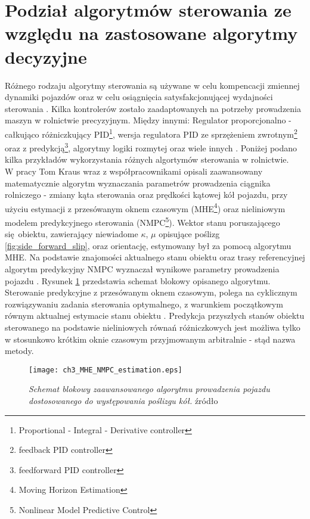 \section{Podział algorytmów sterowania ze względu na zastosowane algorytmy decyzyjne}
Różnego rodzaju algorytmy sterowania są używane w celu kompencacji zmiennej dynamiki pojazdów oraz w celu osiągnięcia satysfakcjonującej wydajności sterowania
 \cite[][strona 770]{CCTA_769_775}. Kilka kontrolerów zostało zaadaptowanych na potrzeby prowadzenia maszyn w rolnictwie precyzyjnym. Między innymi: 
Regulator proporcjonalno - całkująco różniczkujący PID\footnote{Proportional - Integral - Derivative controller}, wersja regulatora PID ze sprzężeniem zwrotnym\footnote
{feedback PID controller} oraz z predykcją\footnote{feedforward PID controller}, algorytmy logiki rozmytej oraz wiele innych \cite[][strona 1099]{automation_in_agriculture}.
Poniżej podano kilka przykładów wykorzystania różnych algortymów sterowania w rolnictwie.\\
\indent W pracy \cite[]{KRAUS} Tom Kraus wraz z współpracownikami opisali zaawansowany matematycznie algorytm wyznaczania parametrów prowadzenia 
ciągnika rolniczego - zmiany kąta sterowania oraz prędkości kątowej kół pojazdu, przy użyciu estymacji z przesówanym oknem czasowym (MHE\footnote{
Moving Horizon Estimation}) oraz nieliniowym modelem predykcyjnego sterowania (NMPC\footnote{Nonlinear Model Predictive Control}).
Wektor stanu poruszającego się obiektu, zawierający niewiadome $\kappa$, $\mu$ opisujące poślizg \ref{fig:side_forward_slip}, oraz orientację,
estymowany był za pomocą algorytmu MHE. Na podstawie znajomości aktualnego stanu obiektu oraz trasy referencyjnej algorytm predykcyjny NMPC wyznaczał wynikowe parametry 
prowadzenia pojazdu \cite[][strona 30]{KRAUS}. Rysunek \ref{fig:MHE_NMPC_diagram} przedstawia schemat blokowy opisanego algorytmu. 
Sterowanie predykcyjne z przesówanym oknem czasowym, polega na cyklicznym rozwiązywaniu zadania sterowania optymalnego, z warunkiem początkowym 
równym aktualnej estymacie stanu obiektu \cite[][strona 2]{BANIA}. Predykcja przyszłych stanów obiektu sterowanego na podstawie nieliniowych równań różniczkowych jest możliwa 
tylko w stosunkowo krótkim oknie czasowym przyjmowanym arbitralnie - stąd nazwa metody.
\begin{figure}[H]
	\centering
	\texttt{[image: ch3\_MHE\_NMPC\_estimation.eps]}
	\caption{\textit{Schemat blokowy zaawansowanego algorytmu prowadzenia pojazdu dostosowanego do występowania poślizgu kół.}
	źródło \cite[][strona 30]{KRAUS}}
	\label{fig:MHE_NMPC_diagram}
\end{figure}

